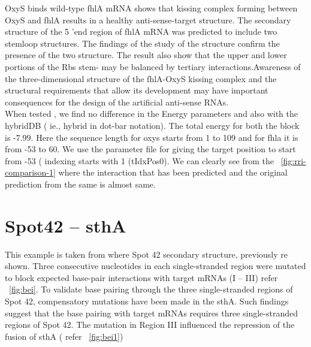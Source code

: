 \documentclass[twoside,a4paper]{report}
\begin{document}
	 OxyS binds wild-type fhlA mRNA shows that kissing complex forming between OxyS and fhlA results in a healthy anti-sense-target structure. The secondary structure of the 5 'end region of fhlA mRNA was predicted to include two stemloop structures. The findings of the study of the structure confirm the presence of the two structure. The result also show that the upper and lower portions of the Rbs stem- may be balanced by tertiary interactions.Awareness of the three-dimensional structure of the fhlA-OxyS kissing complex and the structural requirements that allow its development may have important consequences for the design of the artificial anti-sense RNAs. \\
	   
	 When tested , we find no difference in the Energy parameters and also with the hybridDB ( ie., hybrid in dot-bar notation). The total energy for both the block is -7.99. Here the sequence length for oxys starts from 1 to 109 and for fhla it is from -53 to 60. We use the parameter file for giving the target position to start from -53 ( indexing starts with 1 (tIdxPos0). We can clearly see from the ~\ref{fig:rri-comparison-1} where the interaction that has been predicted and the original prediction from the same is almost same. \\
	 
	 \section{Spot42 – sthA }
	 This example is taken from \citep{beisel2011base} where Spot 42 secondary structure, previously re shown. Three consecutive nucleotides in each single-stranded region were mutated to block expected base-pair interactions with target mRNAs (I – III) refer ~\ref{fig:bei}. To validate base pairing through the three single-stranded regions of Spot 42, compensatory mutations have been made in the sthA. Such findings suggest that the base pairing with target mRNAs requires three single-stranded regions of Spot 42. The mutation in Region III influenced the repression of the fusion of sthA ( refer ~\ref{fig:bei1})  \\
	 
\end{document}
